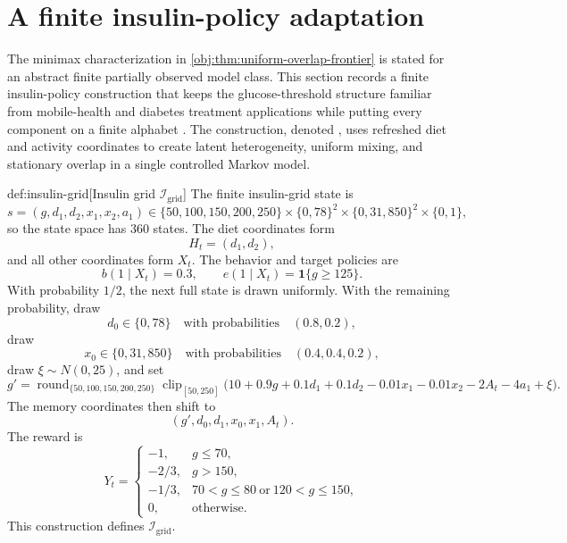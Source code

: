 \section{A finite insulin-policy adaptation}

The minimax characterization in \cref{obj:thm:uniform-overlap-frontier} is stated for an abstract finite partially observed model class. This section records a finite insulin-policy construction that keeps the glucose-threshold structure familiar from mobile-health and diabetes treatment applications while putting every component on a finite alphabet \citep{MaahsEtAl2012,LiaoKlasnjaMurphy2021,LuckettEtAl2020}. The construction, denoted , uses refreshed diet and activity coordinates to create latent heterogeneity, uniform mixing, and stationary overlap in a single controlled Markov model.

\begin{definitionv}{def:insulin-grid}[Insulin grid \(\mathcal I_{\mathrm{grid}}\)]
The finite insulin-grid state is
\[
s=(g,d_1,d_2,x_1,x_2,a_1)
\in
\{50,100,150,200,250\}
\times\{0,78\}^2
\times\{0,31,850\}^2
\times\{0,1\},
\]
so the state space has \(360\) states. The diet coordinates form
\[
H_t=(d_1,d_2),
\]
and all other coordinates form \(X_t\). The behavior and target policies are
\[
b(1\mid X_t)=0.3,
\qquad
e(1\mid X_t)=\mathbf 1\{g\ge 125\}.
\]
With probability \(1/2\), the next full state is drawn uniformly. With the remaining probability, draw
\[
d_0\in\{0,78\}
\quad\text{with probabilities}\quad
(0.8,0.2),
\]
draw
\[
x_0\in\{0,31,850\}
\quad\text{with probabilities}\quad
(0.4,0.4,0.2),
\]
draw \(\xi\sim N(0,25)\), and set
\[
g'
=
\operatorname{round}_{\{50,100,150,200,250\}}
\operatorname{clip}_{[50,250]}
\bigl(
10+0.9g+0.1d_1+0.1d_2-0.01x_1-0.01x_2-2A_t-4a_1+\xi
\bigr).
\]
The memory coordinates then shift to
\[
(g',d_0,d_1,x_0,x_1,A_t).
\]
The reward is
\[
Y_t=
\begin{cases}
-1, & g\le 70,\\
-2/3, & g>150,\\
-1/3, & 70<g\le 80\ \text{or}\ 120<g\le 150,\\
0, & \text{otherwise}.
\end{cases}
\]
This construction defines \(\mathcal I_{\mathrm{grid}}\).
\end{definitionv}

